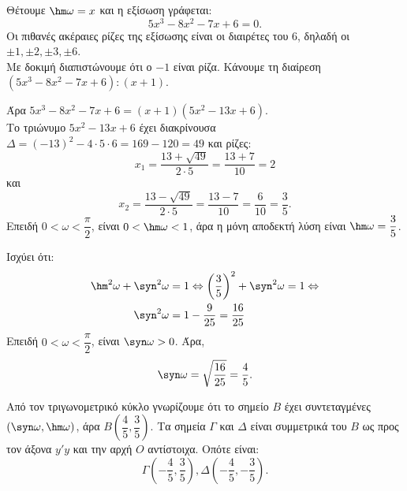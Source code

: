 \begin{alist}
\item Θέτουμε $\hm \omega = x$ και η εξίσωση γράφεται:
\[5x^3 - 8x^2 - 7x + 6 = 0.\]
Οι πιθανές ακέραιες ρίζες της εξίσωσης είναι οι διαιρέτες του 6, δηλαδή οι $\pm 1, \pm 2, \pm 3, \pm 6$. \\
Με δοκιμή διαπιστώνουμε ότι ο $-1$ είναι ρίζα. Κάνουμε τη διαίρεση $(5x^3 - 8x^2 - 7x + 6) : (x + 1)$.
\begin{center}
\end{center}
Άρα $5x^3 - 8x^2 - 7x + 6 = (x + 1)(5x^2 - 13x + 6)$. \\
Το τριώνυμο $5x^2 - 13x + 6$ έχει διακρίνουσα $\Delta = (-13)^2 - 4 \cdot 5 \cdot 6 = 169 - 120 = 49$ και ρίζες:
\[x_1 = \frac{13 + \sqrt{49}}{2 \cdot 5} = \frac{13 + 7}{10} = 2\]
και
\[x_2 = \frac{13 - \sqrt{49}}{2 \cdot 5} = \frac{13 - 7}{10} = \frac{6}{10} = \frac{3}{5}.\]
Επειδή $0 < \omega < \dfrac{\pi}{2}$, είναι $0 < \hm \omega < 1$, άρα η μόνη αποδεκτή λύση είναι $\hm \omega = \dfrac{3}{5}$.
\item
\begin{rlist}
\item Ισχύει ότι:
\begin{align*}
\hm ^2\omega + \syn ^2\omega &= 1 \Leftrightarrow \left(\frac{3}{5}\right)^2 + \syn ^2\omega = 1 \Leftrightarrow \\
\syn ^2\omega &= 1 - \frac{9}{25} = \frac{16}{25}
\end{align*}
Επειδή $0 < \omega < \dfrac{\pi}{2}$, είναι $\syn \omega > 0$. Άρα,
\[\syn \omega = \sqrt{\frac{16}{25}} = \frac{4}{5}.\]
\item Από τον τριγωνομετρικό κύκλο γνωρίζουμε ότι το σημείο $B$ έχει συντεταγμένες $(\syn \omega, \hm \omega)$, άρα $B\left(\dfrac{4}{5}, \dfrac{3}{5}\right)$. Τα σημεία $\Gamma$ και $\Delta$ είναι συμμετρικά του $B$ ως προς τον άξονα $y'y$ και την αρχή $O$ αντίστοιχα. Οπότε είναι:
\[\Gamma\left(-\frac{4}{5}, \frac{3}{5}\right), \Delta\left(-\frac{4}{5}, -\frac{3}{5}\right).\]
\end{rlist}
\end{alist}

